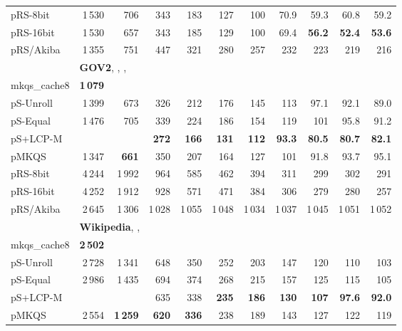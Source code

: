 \documentclass[a4paper]{myjournal}
\begin{document}
\begin{table}
\begin{tabular}{l|*{10}{r}|@{}}
     pRS-8bit & 1\,530 &     706 &     343 &     183 &      127 &      100 &     70.9 &     59.3 &     60.8 &     59.2 \\
    pRS-16bit & 1\,530 &     657 &     343 &     185 &      129 &      100 &     69.4 & \bf 56.2 & \bf 52.4 & \bf 53.6 \\
    pRS/Akiba & 1\,355 &     751 &     447 &     321 &      280 &      257 &      232 &      223 &      219 &      216 \\ \hline
& \multicolumn{10}{l|}{\textbf{GOV2}, , , } \\ \cline{2-11}
mkqs\_cache8 & \bf 1\,079 &  &  &  &  &  &  &  &  &  \\
pS-Unroll & 1\,399 &     673 &     326 &     212 &     176 &     145 &      113 &     97.1 &     92.1 &     89.0 \\
 pS-Equal & 1\,476 &     705 &     339 &     224 &     186 &     154 &      119 &      101 &     95.8 &     91.2 \\
 pS+LCP-M &        &         & \bf 272 & \bf 166 & \bf 131 & \bf 112 & \bf 93.3 & \bf 80.5 & \bf 80.7 & \bf 82.1 \\
        pMKQS & 1\,347 & \bf 661 &     350 &     207 &     164 &     127 &      101 &     91.8 &     93.7 &     95.1 \\
     pRS-8bit & 4\,244 &  1\,992 &     964 &     585 &     462 &     394 &      311 &      299 &      302 &      291 \\
    pRS-16bit & 4\,252 &  1\,912 &     928 &     571 &     471 &     384 &      306 &      279 &      280 &      257 \\
    pRS/Akiba & 2\,645 &  1\,306 &  1\,028 &  1\,055 &  1\,048 &  1\,034 &   1\,037 &   1\,045 &   1\,051 &   1\,052 \\ \hline
& \multicolumn{10}{l|}{\textbf{Wikipedia}, , } \\ \cline{2-11}
mkqs\_cache8 & \bf 2\,502 &  &  &  &  &  &  &  &  &  \\
pS-Unroll & 2\,728 &     1\,341 &     648 &     350 &     252 &     203 &     147 &     120 &      110 &      103 \\
 pS-Equal & 2\,986 &     1\,435 &     694 &     374 &     268 &     215 &     157 &     125 &      115 &      105 \\
 pS+LCP-M &        &            &     635 &     338 & \bf 235 & \bf 186 & \bf 130 & \bf 107 & \bf 97.6 & \bf 92.0 \\
        pMKQS & 2\,554 & \bf 1\,259 & \bf 620 & \bf 336 &     238 &     189 &     143 &     127 &      122 &      119 \\

\end{tabular}
\end{table}
\end{document}
